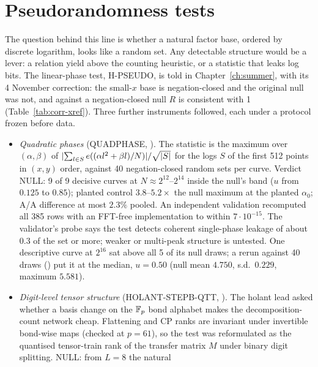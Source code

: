 \section{Pseudorandomness tests}\label{sec:ln-instruments}

The question behind this line is whether a natural factor base, ordered by
discrete logarithm, looks like a random set. Any detectable structure would
be a lever: a relation yield above the counting heuristic, or a statistic
that leaks log bits. The linear-phase test, H-PSEUDO, is told in
Chapter~\ref{ch:summer}, with its 4 November correction: the small-$x$ base
is negation-closed and the original null was not, and against a
negation-closed null $R$ is consistent with 1 (Table~\ref{tab:corr-xref}).
Three further instruments followed, each under a protocol frozen before
data.
\begin{itemize}
\item \emph{Quadratic phases} (QUADPHASE,
  ). The
  statistic is the maximum over $(\alpha,\beta)$ of
  $\lvert \sum_{l\in S}e((\alpha l^2+\beta l)/N) \rvert/\sqrt{\lvert S \rvert}$ for the logs $S$ of the
  first 512 points in $(x,y)$ order, against 40 negation-closed random sets
  per curve. Verdict NULL: 9 of 9 decisive curves at $N\approx2^{12}$--$2^{14}$
  inside the null's band ($u$ from $0.125$ to $0.85$); planted control
  $3.8$--$5.2\times$ the null maximum at the planted $\alpha_0$; A/A difference at
  most $2.3\%$ pooled. An independent validation recomputed all 385 rows with
  an FFT-free implementation to within $7\cdot10^{-15}$. The validator's probe
  says the test detects coherent single-phase leakage of about $0.3$ of the
  set or more; weaker or multi-peak structure is untested. One descriptive
  curve at $2^{16}$ sat above all 5 of its null draws; a rerun against 40 draws
  ()
  put it at the median, $u=0.50$ (null mean $4.750$, s.d.\ $0.229$, maximum
  $5.581$).
\item \emph{Digit-level tensor structure} (HOLANT-STEPB-QTT,
  ).
  The holant lead asked whether a basis change on the $\mathbb{F}_p$ bond alphabet
  makes the decomposition-count network cheap. Flattening and CP ranks are
  invariant under invertible bond-wise maps (checked at $p=61$), so the test
  was reformulated as the quantised tensor-train rank of the transfer matrix
  $M$ under binary digit splitting. NULL: from $L=8$ the natural

\end{itemize}
